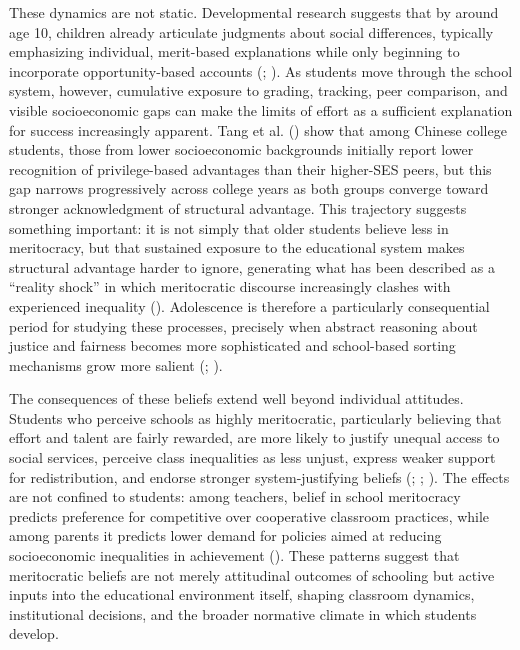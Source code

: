 \documentclass[
  13pt,
]{article}
\begin{document}
These dynamics are not static. Developmental research suggests that by
around age 10, children already articulate judgments about social
differences, typically emphasizing individual, merit-based explanations
while only beginning to incorporate opportunity-based accounts
(;
). As students move
through the school system, however, cumulative exposure to grading,
tracking, peer comparison, and visible socioeconomic gaps can make the
limits of effort as a sufficient explanation for success increasingly
apparent. Tang et al. () show
that among Chinese college students, those from lower socioeconomic
backgrounds initially report lower recognition of privilege-based
advantages than their higher-SES peers, but this gap narrows
progressively across college years as both groups converge toward
stronger acknowledgment of structural advantage. This trajectory
suggests something important: it is not simply that older students
believe less in meritocracy, but that sustained exposure to the
educational system makes structural advantage harder to ignore,
generating what has been described as a ``reality shock'' in which
meritocratic discourse increasingly clashes with experienced inequality
(). Adolescence is therefore a
particularly consequential period for studying these processes,
precisely when abstract reasoning about justice and fairness becomes
more sophisticated and school-based sorting mechanisms grow more salient
(;
).

The consequences of these beliefs extend well beyond individual
attitudes. Students who perceive schools as highly meritocratic,
particularly believing that effort and talent are fairly rewarded, are
more likely to justify unequal access to social services, perceive class
inequalities as less unjust, express weaker support for redistribution,
and endorse stronger system-justifying beliefs
(;
;
). The
effects are not confined to students: among teachers, belief in school
meritocracy predicts preference for competitive over cooperative
classroom practices, while among parents it predicts lower demand for
policies aimed at reducing socioeconomic inequalities in achievement
(). These
patterns suggest that meritocratic beliefs are not merely attitudinal
outcomes of schooling but active inputs into the educational environment
itself, shaping classroom dynamics, institutional decisions, and the
broader normative climate in which students develop.
\end{document}
